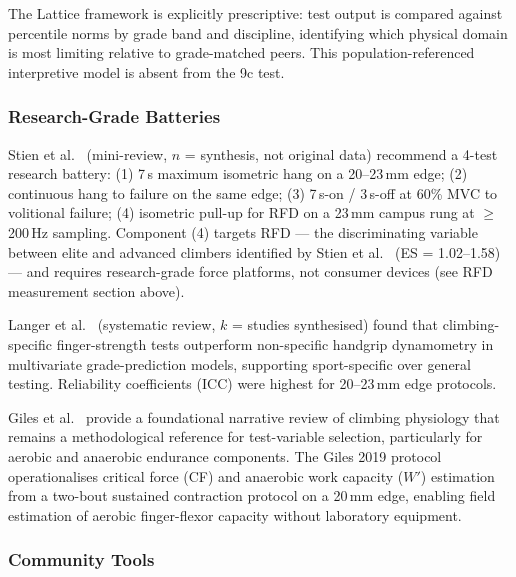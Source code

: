 The Lattice framework is explicitly prescriptive: test output is compared against percentile norms by grade band and discipline, identifying which physical domain is most limiting relative to grade-matched peers. This population-referenced interpretive model is absent from the 9c test.

\subsubsection{Research-Grade Batteries}

Stien et al.\ \cite{SSA22} (mini-review, $n$ = synthesis, not original data) recommend a 4-test research battery: (1) 7\,s maximum isometric hang on a 20--23\,mm edge; (2) continuous hang to failure on the same edge; (3) 7\,s-on / 3\,s-off at 60\% MVC to volitional failure; (4) isometric pull-up for RFD on a 23\,mm campus rung at $\geq$200\,Hz sampling. Component (4) targets RFD --- the discriminating variable between elite and advanced climbers identified by Stien et al.\ \cite{SVS+21} (ES = 1.02--1.58) --- and requires research-grade force platforms, not consumer devices (see RFD measurement section above).

Langer et al.\ \cite{LSW23} (systematic review, $k$ = studies synthesised) found that climbing-specific finger-strength tests outperform non-specific handgrip dynamometry in multivariate grade-prediction models, supporting sport-specific over general testing. Reliability coefficients (ICC) were highest for 20--23\,mm edge protocols.

Giles et al.\ \cite{GRT06} provide a foundational narrative review of climbing physiology that remains a methodological reference for test-variable selection, particularly for aerobic and anaerobic endurance components. The Giles 2019 protocol \cite{GCT+19} operationalises critical force (CF) and anaerobic work capacity ($W'$) estimation from a two-bout sustained contraction protocol on a 20\,mm edge, enabling field estimation of aerobic finger-flexor capacity without laboratory equipment.

\subsubsection{Community Tools}

